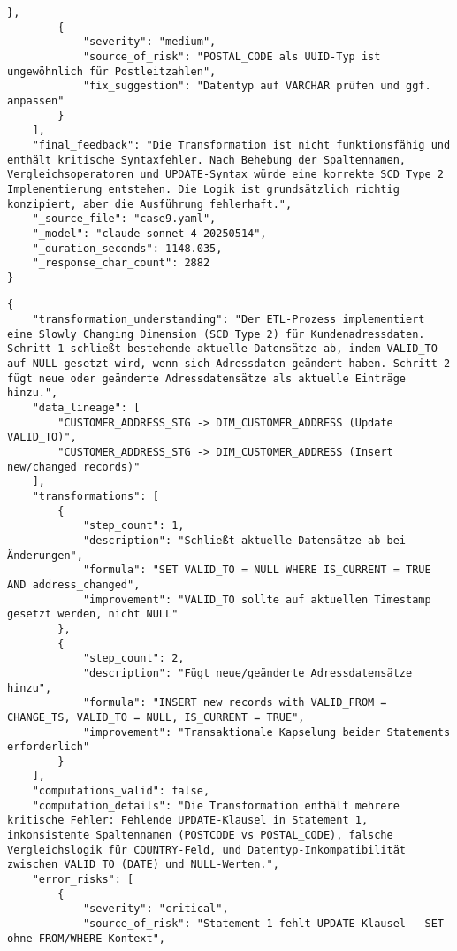 \begin{lstlisting}[caption={Ausgabe: Claude Sonnet 4 Anwendungsfall 9 Hauptdurchlauf},label={claude_case9_prompt1}]
        },
        {
            "severity": "medium",
            "source_of_risk": "POSTAL_CODE als UUID-Typ ist ungewöhnlich für Postleitzahlen",
            "fix_suggestion": "Datentyp auf VARCHAR prüfen und ggf. anpassen"
        }
    ],
    "final_feedback": "Die Transformation ist nicht funktionsfähig und enthält kritische Syntaxfehler. Nach Behebung der Spaltennamen, Vergleichsoperatoren und UPDATE-Syntax würde eine korrekte SCD Type 2 Implementierung entstehen. Die Logik ist grundsätzlich richtig konzipiert, aber die Ausführung fehlerhaft.",
    "_source_file": "case9.yaml",
    "_model": "claude-sonnet-4-20250514",
    "_duration_seconds": 1148.035,
    "_response_char_count": 2882
}
\end{lstlisting}

\begin{lstlisting}[caption={Ausgabe: Claude Sonnet 4 Anwendungsfall 9 Konsistenzdurchlauf},label={claude_case9_prompt2}]
{
    "transformation_understanding": "Der ETL-Prozess implementiert eine Slowly Changing Dimension (SCD Type 2) für Kundenadressdaten. Schritt 1 schließt bestehende aktuelle Datensätze ab, indem VALID_TO auf NULL gesetzt wird, wenn sich Adressdaten geändert haben. Schritt 2 fügt neue oder geänderte Adressdatensätze als aktuelle Einträge hinzu.",
    "data_lineage": [
        "CUSTOMER_ADDRESS_STG -> DIM_CUSTOMER_ADDRESS (Update VALID_TO)",
        "CUSTOMER_ADDRESS_STG -> DIM_CUSTOMER_ADDRESS (Insert new/changed records)"
    ],
    "transformations": [
        {
            "step_count": 1,
            "description": "Schließt aktuelle Datensätze ab bei Änderungen",
            "formula": "SET VALID_TO = NULL WHERE IS_CURRENT = TRUE AND address_changed",
            "improvement": "VALID_TO sollte auf aktuellen Timestamp gesetzt werden, nicht NULL"
        },
        {
            "step_count": 2,
            "description": "Fügt neue/geänderte Adressdatensätze hinzu",
            "formula": "INSERT new records with VALID_FROM = CHANGE_TS, VALID_TO = NULL, IS_CURRENT = TRUE",
            "improvement": "Transaktionale Kapselung beider Statements erforderlich"
        }
    ],
    "computations_valid": false,
    "computation_details": "Die Transformation enthält mehrere kritische Fehler: Fehlende UPDATE-Klausel in Statement 1, inkonsistente Spaltennamen (POSTCODE vs POSTAL_CODE), falsche Vergleichslogik für COUNTRY-Feld, und Datentyp-Inkompatibilität zwischen VALID_TO (DATE) und NULL-Werten.",
    "error_risks": [
        {
            "severity": "critical",
            "source_of_risk": "Statement 1 fehlt UPDATE-Klausel - SET ohne FROM/WHERE Kontext",

\end{lstlisting}
